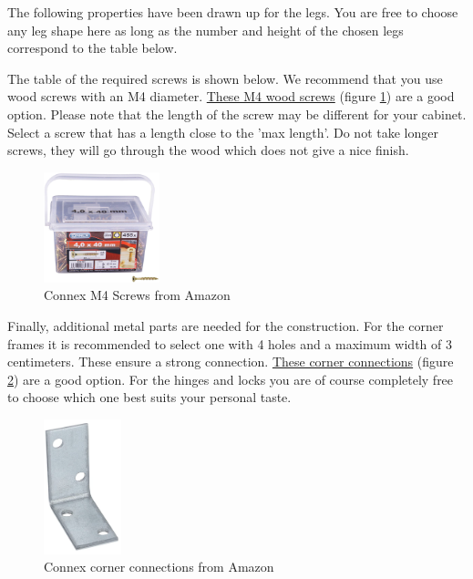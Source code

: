\documentclass{article}
\begin{document}
The following properties have been drawn up for the legs. You are free to choose any leg shape here as long as the number and height of the chosen legs correspond to the table below.



The table of the required screws is shown below. We recommend that you use wood screws with an M4 diameter. \href{https://www.amazon.nl/gp/product/B00B214ZLQ/ref=ppx_yo_dt_b_asin_title_o07_s00?ie=UTF8&psc=1}{These M4 wood screws} (figure \ref{fig:schroeven}) are a good option. Please note that the length of the screw may be different for your cabinet. Select a screw that has a length close to the 'max length'. Do not take longer screws, they will go through the wood which does not give a nice finish.



\begin{figure}[h!]
    \centering
    \includegraphics[width=0.3\textwidth]{schroeven.png}
    \caption{Connex M4 Screws from Amazon}
    \label{fig:schroeven}
\end{figure}

\clearpage
\newpage

Finally, additional metal parts are needed for the construction. For the corner frames it is recommended to select one with 4 holes and a maximum width of 3 centimeters. These ensure a strong connection. \href{https://www.amazon.nl/Connex-HVG2400-voordeelpak-hoekverbinder-verzinkt/dp/B00J7L2ET8/ref=sr_1_9?__mk_nl_NL=%C3%85M%C3%85%C5%BD%C3%95% C3%91&crid=22ED59WFFPB0Z&keywords=corner connector&qid=1660427081&sprefix=corner connector%2Caps%2C85&sr=8-9}{These corner connections} (figure \ref{fig:hoeken}) are a good option. For the hinges and locks you are of course completely free to choose which one best suits your personal taste.



\begin{figure}[h!]
    \centering
    \includegraphics[width=0.2\textwidth]{hoeken.png}
    \caption{Connex corner connections from Amazon}
    \label{fig:hoeken}
\end{figure}
\end{document}
